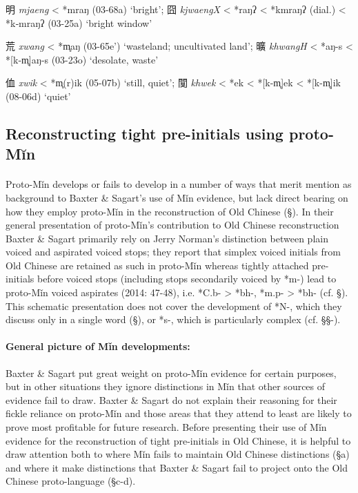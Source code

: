 明  \emph{mjaeng} \textless{} *mraŋ (03-68a) `bright'; 囧 \emph{kjwaengX}
\textless{} *{}raŋʔ \textless{} *kmraŋʔ (dial.) \textless{} *k‑mraŋʔ
(03-25a) `bright window'

荒  \emph{xwang} \textless{} *m̥{}aŋ (03-65e') `wasteland; uncultivated
land'; 曠 \emph{khwangH} \textless{} *{}aŋ-s \textless{}
*[k‑m̥]{}aŋ‑s (03-23o) `desolate, waste'

侐  \emph{xwik} \textless{} *m̥(r)ik (05-07b) `still, quiet'; 闃
 \emph{khwek} \textless{} *{}ek \textless{} *[k-m̥]{}ek \textless{}
*[k-m̥]{}ik (08-06d) `quiet'

\subsection{Reconstructing tight pre-initials using
proto-Mĭn}

\paragraph{} 
\label{par:reconstructing-tight-pre-initials-using-proto-Min}
Proto-Mǐn develops or fails to develop in a number of ways that merit
mention as background to Baxter \& Sagart's use of Mǐn evidence, but
lack direct bearing on how they employ proto-Mǐn in the reconstruction
of Old Chinese (§). In their general presentation of proto-Mǐn's
contribution to Old Chinese reconstruction Baxter \& Sagart primarily
rely on Jerry Norman's distinction between plain voiced and aspirated
voiced stops; they report that simplex voiced initials from Old Chinese
are retained as such in proto-Mǐn whereas tightly attached pre-initials
before voiced stops (including stops secondarily voiced by *m-) lead to
proto-Mǐn voiced aspirates (2014: 47-48), i.e. *C.b- \textgreater{}
*bh-, *m.p- \textgreater{} *bh- (cf. §). This schematic presentation
does not cover the development of *N-, which they discuss only in a
single word (§), or *s-, which is particularly complex (cf. §§-).

\paragraph{General picture of Mǐn
developments:} Baxter \& Sagart put great weight on proto-Mǐn evidence
for certain purposes, but in other situations they ignore distinctions
in Mǐn that other sources of evidence fail to draw. Baxter \& Sagart do
not explain their reasoning for their fickle reliance on proto-Mǐn and
those areas that they attend to least are likely to prove most
profitable for future research. Before presenting their use of Mǐn
evidence for the reconstruction of tight pre-initials in Old Chinese, it
is helpful to draw attention both to where Mǐn fails to maintain Old
Chinese distinctions (§a) and where it make distinctions that Baxter \&
Sagart fail to project onto the Old Chinese proto-language (§c-d).

